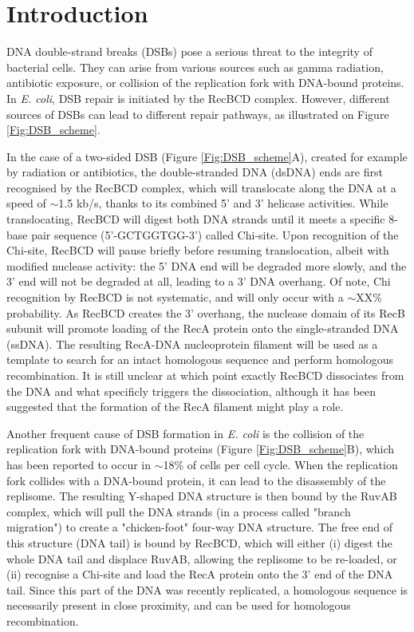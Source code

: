 \section*{Introduction}

DNA double-strand breaks (DSBs) pose a serious threat to the integrity of bacterial cells. They can arise from various sources such as gamma radiation, antibiotic exposure, or collision of the replication fork with DNA-bound proteins. In \emph{E. coli}, DSB repair is initiated by the RecBCD complex. However, different sources of DSBs can lead to different repair pathways, as illustrated on Figure \ref{Fig:DSB_scheme}.

In the case of a two-sided DSB (Figure \ref{Fig:DSB_scheme}A), created for example by radiation or antibiotics, the double-stranded DNA (dsDNA) ends are first recognised by the RecBCD complex, which will translocate along the DNA at a speed of $\sim$1.5 kb/s, thanks to its combined 5' and 3' helicase activities. While translocating, RecBCD will digest both DNA strands until it meets a specific 8-base pair sequence (5'-GCTGGTGG-3') called Chi-site. Upon recognition of the Chi-site, RecBCD will pause briefly before resuming translocation, albeit with modified nuclease activity: the 5' DNA end will be degraded more slowly, and the 3' end will not be degraded at all, leading to a 3' DNA overhang. Of note, Chi recognition by RecBCD is not systematic, and will only occur with a $\sim$XX\% probability. As RecBCD creates the 3' overhang, the nuclease domain of its RecB subunit will promote loading of the RecA protein onto the single-stranded DNA (ssDNA). The resulting RecA-DNA nucleoprotein filament will be used as a template to search for an intact homologous sequence and perform homologous recombination. It is still unclear at which point exactly RecBCD dissociates from the DNA and what specificly triggers the dissociation, although it has been suggested that the formation of the RecA filament might play a role.

Another frequent cause of DSB formation in \emph{E. coli} is the collision of the replication fork with DNA-bound proteins (Figure \ref{Fig:DSB_scheme}B), which has been reported to occur in $\sim$18\% of cells per cell cycle.\cite{Sinha2018} When the replication fork collides with a DNA-bound protein, it can lead to the disassembly of the replisome. The resulting Y-shaped DNA structure is then bound by the RuvAB complex, which will pull the DNA strands (in a process called "branch migration") to create a "chicken-foot" four-way DNA structure. The free end of this structure (DNA tail) is bound by RecBCD, which will either (i) digest the whole DNA tail and displace RuvAB, allowing the replisome to be re-loaded, or (ii) recognise a Chi-site and load the RecA protein onto the 3' end of the DNA tail. Since this part of the DNA was recently replicated, a homologous sequence is necessarily present in close proximity, and can be used for homologous recombination.

